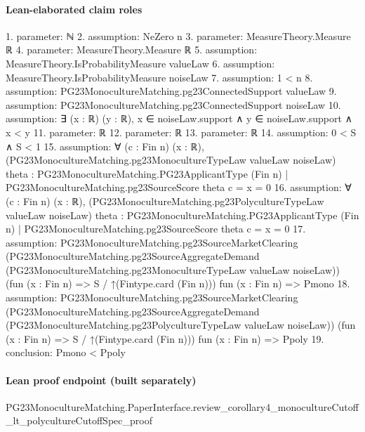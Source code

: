 \documentclass[10pt]{article}
\begin{document}
\paragraph{Lean-elaborated claim roles}\begin{ReviewVerbatim}
1. parameter: ℕ
2. assumption: NeZero n
3. parameter: MeasureTheory.Measure ℝ
4. parameter: MeasureTheory.Measure ℝ
5. assumption: MeasureTheory.IsProbabilityMeasure valueLaw
6. assumption: MeasureTheory.IsProbabilityMeasure noiseLaw
7. assumption: 1 < n
8. assumption: PG23MonocultureMatching.pg23ConnectedSupport valueLaw
9. assumption: PG23MonocultureMatching.pg23ConnectedSupport noiseLaw
10. assumption: ∃ (x : ℝ) (y : ℝ), x ∈ noiseLaw.support ∧ y ∈ noiseLaw.support ∧ x < y
11. parameter: ℝ
12. parameter: ℝ
13. parameter: ℝ
14. assumption: 0 < S ∧ S < 1
15. assumption: ∀ (c : Fin n) (x : ℝ),
  (PG23MonocultureMatching.pg23MonocultureTypeLaw valueLaw noiseLaw)
      {theta : PG23MonocultureMatching.PG23ApplicantType (Fin n) |
        PG23MonocultureMatching.pg23SourceScore theta c = x} =
    0
16. assumption: ∀ (c : Fin n) (x : ℝ),
  (PG23MonocultureMatching.pg23PolycultureTypeLaw valueLaw noiseLaw)
      {theta : PG23MonocultureMatching.PG23ApplicantType (Fin n) |
        PG23MonocultureMatching.pg23SourceScore theta c = x} =
    0
17. assumption: PG23MonocultureMatching.pg23SourceMarketClearing
  (PG23MonocultureMatching.pg23SourceAggregateDemand (PG23MonocultureMatching.pg23MonocultureTypeLaw valueLaw noiseLaw))
  (fun (x : Fin n) => S / ↑(Fintype.card (Fin n))) fun (x : Fin n) => Pmono
18. assumption: PG23MonocultureMatching.pg23SourceMarketClearing
  (PG23MonocultureMatching.pg23SourceAggregateDemand (PG23MonocultureMatching.pg23PolycultureTypeLaw valueLaw noiseLaw))
  (fun (x : Fin n) => S / ↑(Fintype.card (Fin n))) fun (x : Fin n) => Ppoly
19. conclusion: Pmono < Ppoly
\end{ReviewVerbatim}

\paragraph{Lean proof endpoint (built separately)}\begin{ReviewVerbatim}
PG23MonocultureMatching.PaperInterface.review_corollary4_monocultureCutoff_lt_polycultureCutoffSpec_proof
\end{ReviewVerbatim}
\end{document}
